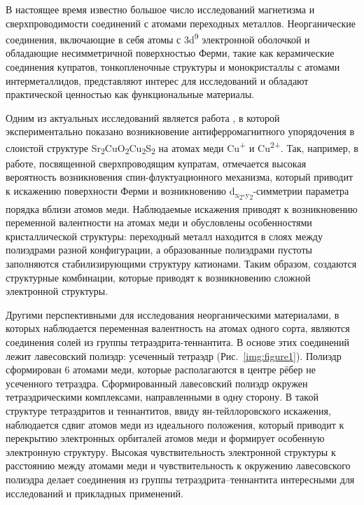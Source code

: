 {\actuality} В настоящее время известно большое число исследований магнетизма и сверхпроводимости соединений с атомами переходных металлов\cite{Slocombe_2015}.
Неорганические соединения, включающие в себя атомы с 3d\textsuperscript{9} электронной оболочкой и обладающие несимметричной поверхностью Ферми, такие как  керамические соединения купратов, тонкопленочные структуры  и монокристаллы с атомами интерметаллидов, представляют интерес для исследований и обладают практической ценностью как функциональные материалы.

Одним из актуальных исследований является работа \cite{Blandy_2018}, в которой экспериментально показано возникновение антиферромагнитного упорядочения в слоистой структуре Sr\textsubscript{2}CuO\textsubscript{2}Cu\textsubscript{2}S\textsubscript{2} на атомах меди Cu\textsuperscript{+} и Cu\textsuperscript{2+}.
Так, например, в работе, посвященной сверхпроводящим купратам\cite{Comin_2015}, отмечается высокая вероятность возникновения спин-флуктуационного механизма, который приводит к искажению поверхности Ферми и возникновению d\textsubscript{x\textsubscript{2}-y\textsubscript{2}}-симметрии параметра порядка вблизи атомов меди.
Наблюдаемые искажения приводят к возникновению переменной валентности на атомах меди и обусловлены особенностями кристаллической структуры: переходный металл находится в слоях между полиэдрами разной конфигурации, а образованные полиэдрами пустоты заполняются стабилизирующими структуру катионами.
Таким образом, создаются структурные комбинации, которые приводят к возникновению сложной электронной структуры.


Другими перспективными для исследования неорганическими материалами, в которых наблюдается переменная валентность на атомах одного сорта, являются соединения солей из группы тетраэдрита-теннантита.
В основе этих соединений лежит лавесовский полиэдр: усеченный тетраэдр (Рис.~\ref{img:figure1}).
Полиэдр сформирован 6 атомами меди, которые располагаются  в центре рёбер не усеченного тетраэдра.
Сформированный лавесовский полиэдр окружен тетраэдрическими комплексами, направленными в одну сторону.
  В такой структуре тетраэдритов и теннантитов, ввиду ян-тейллоровского искажения,   наблюдается сдвиг атомов меди из идеального положения, который приводит к  перекрытию электронных орбиталей атомов меди и формирует особенную электронную структуру.
Высокая чувствительность электронной структуры к расстоянию между атомами меди и чувствительность к окружению лавесовского полиэдра  делает соединения из группы тетраэдрита--теннантита  интересными для исследований и прикладных применений.

